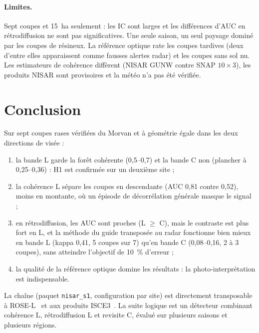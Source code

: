 \paragraph{Limites.} Sept coupes et 15~ha seulement : les IC sont larges et les différences d'AUC en
rétrodiffusion ne sont pas significatives. Une seule saison, un seul paysage dominé par les coupes de
résineux. La référence optique rate les coupes tardives (deux d'entre elles apparaissent comme fausses
alertes radar) et les coupes sans sol nu. Les estimateurs de cohérence diffèrent (NISAR GUNW contre SNAP
$10\times3$), les produits NISAR sont provisoires et la météo n'a pas été vérifiée.

\section{Conclusion}

Sur sept coupes rases vérifiées du Morvan et à géométrie égale dans les deux directions de visée :
\begin{enumerate}
\item la bande L garde la forêt cohérente (0,5--0,7) et la bande C non (plancher à 0,25--0,36) : H1 est
  confirmée sur un deuxième site ;
\item la cohérence L sépare les coupes en descendante (AUC 0,81 contre 0,52), moins en montante, où un
  épisode de décorrélation générale masque le signal ;
\item en rétrodiffusion, les AUC sont proches (L $\geq$ C), mais le contraste est plus fort en L, et la
  méthode du guide transposée au radar fonctionne bien mieux en bande L (kappa 0,41, 5 coupes sur 7) qu'en
  bande C (0,08--0,16, 2 à 3 coupes), sans atteindre l'objectif de 10~\% d'erreur ;
\item la qualité de la référence optique domine les résultats : la photo-interprétation est indispensable.
\end{enumerate}
La chaîne (paquet \texttt{nisar\_s1}, configuration par site) est directement transposable à ROSE-L~\cite{esa2020rosel}
et aux produits ISCE3~\cite{isce3}. La suite logique est un détecteur combinant cohérence L, rétrodiffusion L
et revisite C, évalué sur plusieurs saisons et plusieurs régions.
